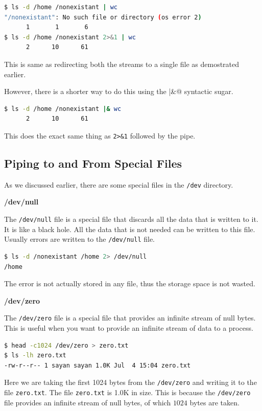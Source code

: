 \begin{lstlisting}[language=bash]
$ ls -d /home /nonexistant | wc
"/nonexistant": No such file or directory (os error 2)
      1       1       6
$ ls -d /home /nonexistant 2>&1 | wc
      2      10      61
\end{lstlisting}

This is same as redirecting both the streams to a single file as
demostrated earlier.

However, there is a shorter way to do this using the \lstinline@|&@
syntactic sugar.

\begin{lstlisting}[language=bash]
$ ls -d /home /nonexistant |& wc
      2      10      61
\end{lstlisting}

This does the exact same thing as \lstinline|2>&1| followed by the pipe.

\subsection{Piping to and From Special Files}

As we discussed earlier, there are some special files in the \lstinline|/dev|
directory.

\textbf{/dev/null}

The \lstinline|/dev/null| file is a special file that discards all the data
that is written to it. It is like a black hole. All the data that is
not needed can be written to this file. Usually errors are written to
the \lstinline|/dev/null| file.

\begin{lstlisting}[language=bash]
$ ls -d /nonexistant /home 2> /dev/null
/home
\end{lstlisting}

The error is not actually stored in any file, thus the storage
space is not wasted.

\textbf{/dev/zero}

The \lstinline|/dev/zero| file is a special file that provides an infinite
stream of null bytes. This is useful when you want to provide an infinite
stream of data to a process.

\begin{lstlisting}[language=bash]
$ head -c1024 /dev/zero > zero.txt
$ ls -lh zero.txt
-rw-r--r-- 1 sayan sayan 1.0K Jul  4 15:04 zero.txt
\end{lstlisting}

Here we are taking the first 1024 bytes from the \lstinline|/dev/zero|
and writing it to the file \lstinline|zero.txt|. The file \lstinline|zero.txt|
is 1.0K in size. This is because the \lstinline|/dev/zero| file provides
an infinite stream of null bytes, of which $1024$ bytes are taken.

